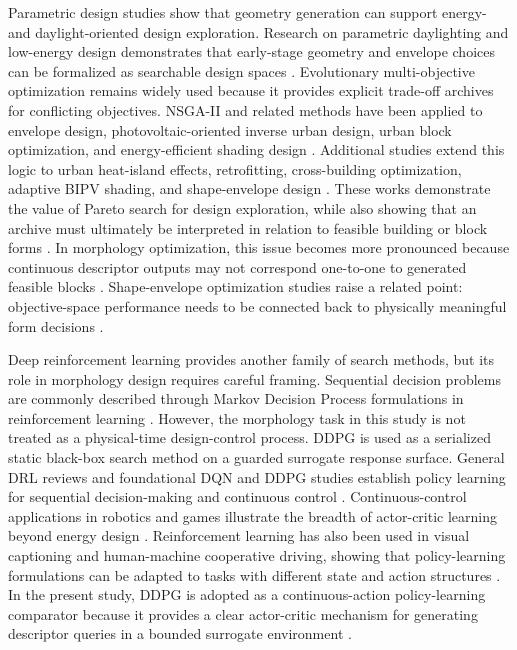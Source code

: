 \documentclass[final,3p,times,numbers,sort&compress]{elsarticle}
\newif\ifshowrevision
\newenvironment{revblock}{%
  \ifshowrevision\color{revisionblue}\fi%
}{}
\begin{document}
\begin{revblock}
Parametric design studies show that geometry generation can support energy- and daylight-oriented design exploration. Research on parametric daylighting and low-energy design demonstrates that early-stage geometry and envelope choices can be formalized as searchable design spaces \cite{ref9,ref10}. Evolutionary multi-objective optimization remains widely used because it provides explicit trade-off archives for conflicting objectives. NSGA-II and related methods have been applied to envelope design, photovoltaic-oriented inverse urban design, urban block optimization, and energy-efficient shading design \cite{ref11,ref12}. Additional studies extend this logic to urban heat-island effects, retrofitting, cross-building optimization, adaptive BIPV shading, and shape-envelope design \cite{ref16,ref17}. These works demonstrate the value of Pareto search for design exploration, while also showing that an archive must ultimately be interpreted in relation to feasible building or block forms \cite{ref23,ref24}. In morphology optimization, this issue becomes more pronounced because continuous descriptor outputs may not correspond one-to-one to generated feasible blocks \cite{ref13,ref22}. Shape-envelope optimization studies raise a related point: objective-space performance needs to be connected back to physically meaningful form decisions \cite{ref25}.

Deep reinforcement learning provides another family of search methods, but its role in morphology design requires careful framing. Sequential decision problems are commonly described through Markov Decision Process formulations in reinforcement learning \cite{puterman1994mdp,sutton2018reinforcement}. However, the morphology task in this study is not treated as a physical-time design-control process. DDPG is used as a serialized static black-box search method on a guarded surrogate response surface. General DRL reviews and foundational DQN and DDPG studies establish policy learning for sequential decision-making and continuous control \cite{ref26,ref31}. Continuous-control applications in robotics and games illustrate the breadth of actor-critic learning beyond energy design \cite{ref27,ref28}. Reinforcement learning has also been used in visual captioning and human-machine cooperative driving, showing that policy-learning formulations can be adapted to tasks with different state and action structures \cite{ref29,ref30}. In the present study, DDPG is adopted as a continuous-action policy-learning comparator because it provides a clear actor-critic mechanism for generating descriptor queries in a bounded surrogate environment \cite{ref32}.


\end{revblock}
\end{document}
